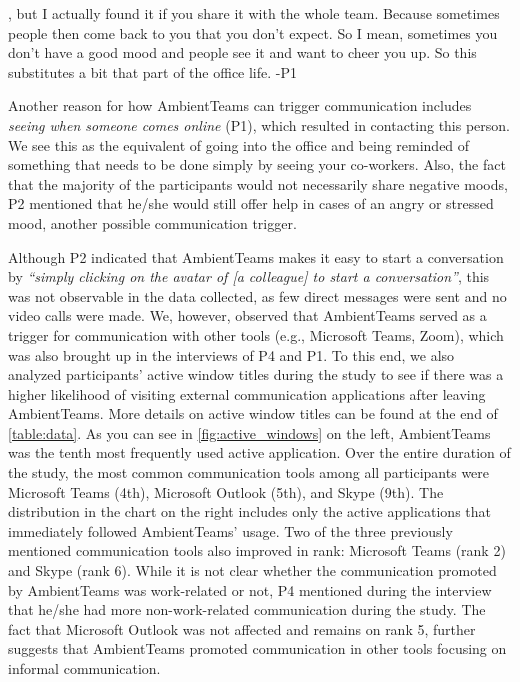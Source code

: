\begin{displayquote}[][]
    [...], but I actually found it if you share it with the whole team. Because sometimes people then come back to you that you don't expect. So I mean, sometimes you don't have a good mood and people see it and want to cheer you up. So this substitutes a bit that part of the office life. -P1
\end{displayquote}

Another reason for how AmbientTeams can trigger communication includes \textit{seeing when someone comes online} (P1), which resulted in contacting this person. We see this as the equivalent of going into the office and being reminded of something that needs to be done simply by seeing your co-workers. Also, the fact that the majority of the participants would not necessarily share negative moods, P2 mentioned that he/she would still offer help in cases of an angry or stressed mood, another possible communication trigger.

Although P2 indicated that AmbientTeams makes it easy to start a conversation by \textit{\enquote{simply clicking on the avatar of [a colleague] to start a conversation}}, this was not observable in the data collected, as few direct messages were sent and no video calls were made. We, however, observed that AmbientTeams served as a trigger for communication with other tools (e.g., Microsoft Teams, Zoom), which was also brought up in the interviews of P4 and P1. To this end, we also analyzed participants' active window titles during the study to see if there was a higher likelihood of visiting external communication applications after leaving AmbientTeams. More details on active window titles can be found at the end of \autoref{table:data}. As you can see in \autoref{fig:active_windows} on the left, AmbientTeams was the tenth most frequently used active application. Over the entire duration of the study, the most common communication tools among all participants were Microsoft Teams (4th), Microsoft Outlook (5th), and Skype (9th). The distribution in the chart on the right includes only the active applications that immediately followed AmbientTeams' usage. Two of the three previously mentioned communication tools also improved in rank: Microsoft Teams (rank 2) and Skype (rank 6). While it is not clear whether the communication promoted by AmbientTeams was work-related or not, P4 mentioned during the interview that he/she had more non-work-related communication during the study. The fact that Microsoft Outlook was not affected and remains on rank 5, further suggests that AmbientTeams promoted communication in other tools focusing on informal communication.

